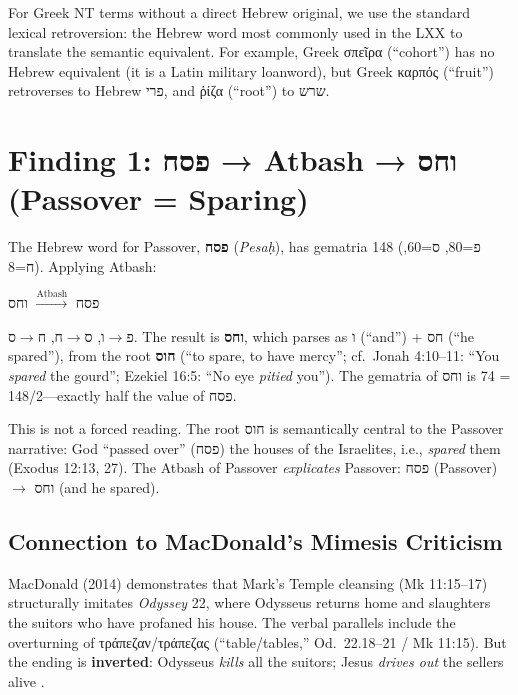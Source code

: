 \documentclass[12pt,a4paper]{article}
\begin{document}
For Greek NT terms without a direct Hebrew original, we use the standard lexical retroversion: the Hebrew word most commonly used in the LXX to translate the semantic equivalent. For example, Greek σπεῖρα (``cohort'') has no Hebrew equivalent (it is a Latin military loanword), but Greek καρπός (``fruit'') retroverses to Hebrew פרי, and ῥίζα (``root'') to שרש.

\section{Finding 1: פסח → Atbash → וחס (Passover = Sparing)}
\label{sec:pesach}

The Hebrew word for Passover, \textbf{פסח} (\textit{Pesaḥ}), has gematria 148 (פ=80, ס=60, ח=8). Applying Atbash:

\begin{center}
\Large
פסח $\xrightarrow{\text{Atbash}}$ וחס
\end{center}

\noindent פ$\to$ו, ס$\to$ח, ח$\to$ס. The result is \textbf{וחס}, which parses as ו (``and'') + חס (``he spared''), from the root \textbf{חוס} (``to spare, to have mercy''; cf.\ Jonah 4:10--11: ``You \textit{spared} the gourd''; Ezekiel 16:5: ``No eye \textit{pitied} you''). The gematria of וחס is 74 = 148/2---exactly half the value of פסח.

This is not a forced reading. The root חוס is semantically central to the Passover narrative: God ``passed over'' (פסח) the houses of the Israelites, i.e., \textit{spared} them (Exodus 12:13, 27). The Atbash of Passover \textit{explicates} Passover: פסח (Passover) $\to$ וחס (and he spared).

\subsection{Connection to MacDonald's Mimesis Criticism}

MacDonald (2014) demonstrates that Mark's Temple cleansing (Mk 11:15--17) structurally imitates \textit{Odyssey} 22, where Odysseus returns home and slaughters the suitors who have profaned his house. The verbal parallels include the overturning of τράπεζαν/τράπεζας (``table/tables,'' Od.\ 22.18--21 / Mk 11:15). But the ending is \textbf{inverted}: Odysseus \textit{kills} all the suitors; Jesus \textit{drives out} the sellers alive \parencite{macdonald2014}.
\end{document}

